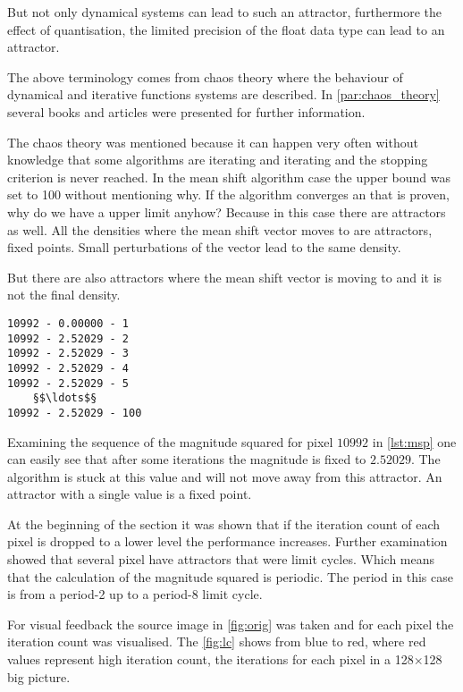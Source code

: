 But not only dynamical systems can lead to such an attractor, furthermore the 
effect of quantisation, the limited precision of the float data type can lead to
an attractor. 

The above terminology comes from chaos theory where the behaviour of dynamical
and iterative functions systems are described. In \autoref{par:chaos_theory} 
several books and articles were presented for further information. 

The chaos theory was mentioned because it can happen very often without knowledge
that some algorithms are iterating and iterating and the stopping criterion is never
reached. In the mean shift algorithm case the upper bound was set to 100 without
mentioning why. If the algorithm converges an that is proven, why do we have a 
upper limit anyhow? Because in this case there are attractors as well. All the 
densities where the mean shift vector moves to are attractors, fixed points.
Small perturbations of the vector lead to the same density. 

But there are also attractors where the mean shift vector is moving to and it is
not the final density. 

\begin{lstlisting}[caption=Magnitude squared of pixel 10992, label=lst:msp]
10992 - 0.00000 - 1
10992 - 2.52029 - 2
10992 - 2.52029 - 3
10992 - 2.52029 - 4
10992 - 2.52029 - 5
	§$\ldots$§
10992 - 2.52029 - 100
\end{lstlisting}
Examining the sequence of the magnitude squared for pixel $10992$ in
\autoref{lst:msp} one can easily see that after some iterations the magnitude is
fixed to $2.52029$. The algorithm is stuck at this value and will not move away
from this attractor. An attractor with a single value is a fixed point. 

At the beginning of the section it was shown that if the iteration count of each
pixel is dropped to a lower level the performance increases. Further examination
showed that several pixel have attractors that were limit cycles. Which means that
the calculation of the magnitude squared is periodic. The period in this case
is from a period-2 up to a period-8 limit cycle.

For visual feedback the source image in \autoref{fig:orig} was taken and for
each pixel the iteration count was visualised. The \autoref{fig:lc} shows
from blue to red, where red values represent high iteration count, the iterations
for each pixel in a 128$\times$128 big picture.

